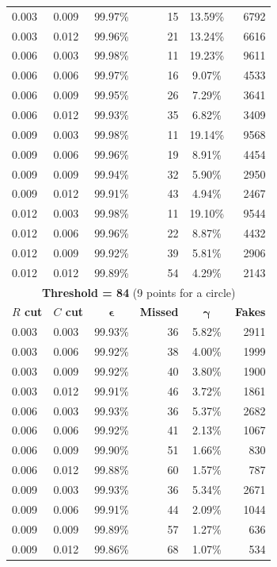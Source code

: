 \documentclass[11pt]{scrreprt}
\begin{document}
\begin{longtable}{llcrcr}
0.003 & 0.009 & 99.97\% & 15 & 13.59\% & 6792 \\
0.003 & 0.012 & 99.96\% & 21 & 13.24\% & 6616 \\
0.006 & 0.003 & 99.98\% & 11 & 19.23\% & 9611 \\
0.006 & 0.006 & 99.97\% & 16 & 9.07\% & 4533 \\
0.006 & 0.009 & 99.95\% & 26 & 7.29\% & 3641 \\
0.006 & 0.012 & 99.93\% & 35 & 6.82\% & 3409 \\
0.009 & 0.003 & 99.98\% & 11 & 19.14\% & 9568 \\
0.009 & 0.006 & 99.96\% & 19 & 8.91\% & 4454 \\
0.009 & 0.009 & 99.94\% & 32 & 5.90\% & 2950 \\
0.009 & 0.012 & 99.91\% & 43 & 4.94\% & 2467 \\
0.012 & 0.003 & 99.98\% & 11 & 19.10\% & 9544 \\
0.012 & 0.006 & 99.96\% & 22 & 8.87\% & 4432 \\
0.012 & 0.009 & 99.92\% & 39 & 5.81\% & 2906 \\
0.012 & 0.012 & 99.89\% & 54 & 4.29\% & 2143 \\
\bottomrule
\toprule
\multicolumn{6}{c}{\textbf{Threshold = 84} (9 points for a circle)}\\
\midrule
\textbf{$R$ cut} & \textbf{$C$ cut} & $\boldsymbol{\epsilon}$ & \textbf{Missed} & $\boldsymbol{\gamma}$ & \textbf{Fakes} \\
\midrule
0.003 & 0.003 & 99.93\% & 36 & 5.82\% & 2911 \\
0.003 & 0.006 & 99.92\% & 38 & 4.00\% & 1999 \\
0.003 & 0.009 & 99.92\% & 40 & 3.80\% & 1900 \\
0.003 & 0.012 & 99.91\% & 46 & 3.72\% & 1861 \\
0.006 & 0.003 & 99.93\% & 36 & 5.37\% & 2682 \\
0.006 & 0.006 & 99.92\% & 41 & 2.13\% & 1067 \\
0.006 & 0.009 & 99.90\% & 51 & 1.66\% & 830 \\
0.006 & 0.012 & 99.88\% & 60 & 1.57\% & 787 \\
0.009 & 0.003 & 99.93\% & 36 & 5.34\% & 2671 \\
0.009 & 0.006 & 99.91\% & 44 & 2.09\% & 1044 \\
0.009 & 0.009 & 99.89\% & 57 & 1.27\% & 636 \\
0.009 & 0.012 & 99.86\% & 68 & 1.07\% & 534 \\

\end{longtable}
\end{document}
